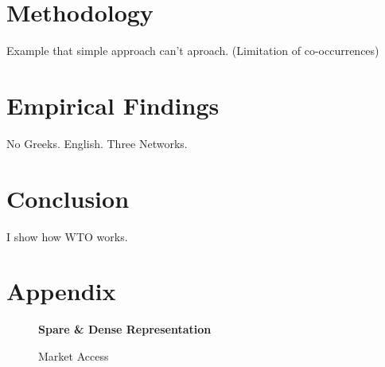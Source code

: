 \documentclass[12pt,letterpaper]{article}
\begin{document}
\section{Methodology}
Example that simple approach can't aproach. (Limitation of co-occurrences)

\section{Empirical Findings}
No Greeks. English. Three Networks.

\section{Conclusion}
I show how WTO works.


\section{Appendix}
\begin{figure}[!tbp]
  \begin{subfigure}[b]{0.49\textwidth}
    \label{fig:f1}
  \end{subfigure}
  \hfill
  \begin{subfigure}[b]{0.49\textwidth}
    \label{fig:f2}
  \end{subfigure}
  \caption{\bf Spare \& Dense Representation}
\end{figure}

\begin{figure}
  \centering{
    
  }
  \caption{Market Access}
  \label{fig:f2}
\end{figure}


\end{document}
